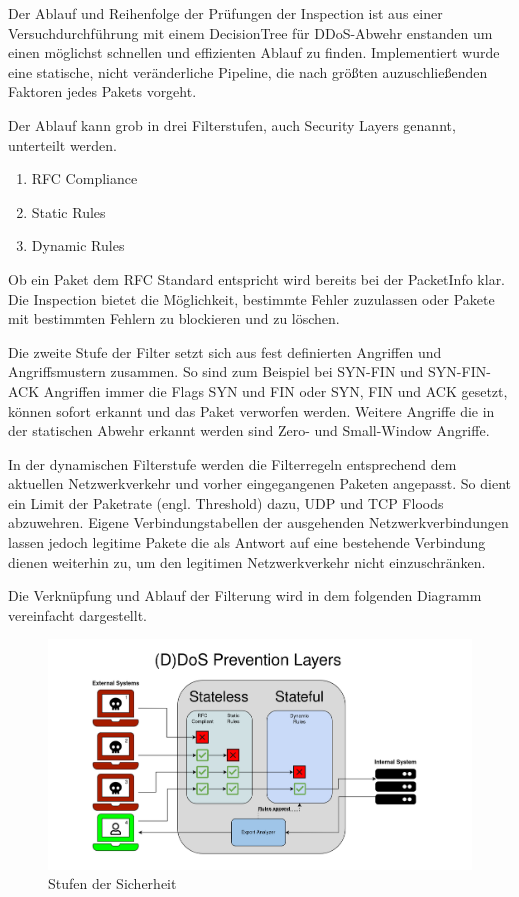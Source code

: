\documentclass[../review_2.tex]{subfiles}
\begin{document}
Der Ablauf und Reihenfolge der Prüfungen der Inspection ist aus einer Versuchdurchführung mit einem DecisionTree für DDoS-Abwehr enstanden um einen möglichst schnellen und effizienten Ablauf zu finden. Implementiert wurde eine statische, nicht veränderliche Pipeline, die nach größten auzuschließenden Faktoren jedes Pakets vorgeht.

Der Ablauf kann grob in drei Filterstufen, auch Security Layers genannt, unterteilt werden.
\begin{enumerate}
    \item RFC Compliance
    \item Static Rules
    \item Dynamic Rules
\end{enumerate}
Ob ein Paket dem RFC Standard entspricht wird bereits bei der PacketInfo klar. Die Inspection bietet die Möglichkeit, bestimmte Fehler zuzulassen oder Pakete mit bestimmten Fehlern zu blockieren und zu löschen.

Die zweite Stufe der Filter setzt sich aus fest definierten Angriffen und Angriffsmustern zusammen. So sind zum Beispiel bei SYN-FIN und SYN-FIN-ACK Angriffen immer die Flags SYN und FIN oder SYN, FIN und ACK gesetzt, können sofort erkannt und das Paket verworfen werden. Weitere Angriffe die in der statischen Abwehr erkannt werden sind Zero- und Small-Window Angriffe.

In der dynamischen Filterstufe werden die Filterregeln entsprechend dem aktuellen Netzwerkverkehr und vorher eingegangenen Paketen angepasst. So dient ein Limit der Paketrate (engl. Threshold) dazu, UDP und TCP Floods abzuwehren. Eigene Verbindungstabellen der ausgehenden Netzwerkverbindungen lassen jedoch legitime Pakete die als Antwort auf eine bestehende Verbindung dienen weiterhin zu, um den legitimen Netzwerkverkehr nicht einzuschränken.

Die Verknüpfung und Ablauf der Filterung wird in dem folgenden Diagramm vereinfacht dargestellt.
\begin{figure}[h]
    \centering
    \includegraphics[width=\linewidth]{img/Security_Layers.png}
    \caption{Stufen der Sicherheit}
    \label{security_layers}
\end{figure}
\end{document}
